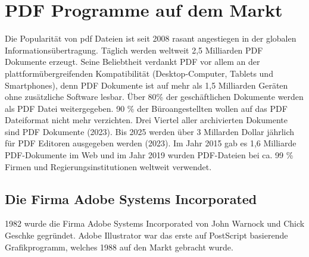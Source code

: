 \chapter{PDF Programme auf dem Markt}
Die Popularität von \gls{pdf} Dateien ist seit 2008 rasant angestiegen in der globalen Informationsübertragung. Täglich werden weltweit 2,5 Milliarden PDF Dokumente erzeugt. Seine Beliebtheit verdankt PDF vor allem an der plattformübergreifenden Kompatibilität (Desktop-Computer, Tablets und Smartphones), denn PDF Dokumente ist auf mehr als 1,5 Milliarden Geräten ohne zusätzliche Software lesbar. Über 80\% der geschäftlichen Dokumente werden als PDF Datei weitergegeben. \cite{formilo} 90 \% der Büroangestellten wollen auf das PDF Dateiformat nicht mehr verzichten. Drei Viertel aller archivierten Dokumente sind PDF Dokumente (2023). \cite{kofax}
Bis 2025 werden über 3 Millarden Dollar jährlich für PDF Editoren ausgegeben werden (2023). \cite{kofax} Im Jahr 2015 gab es 1,6 Milliarde PDF-Dokumente im Web und im Jahr 2019 wurden PDF-Dateien bei ca. 99 \% Firmen und Regierungsinstitutionen weltweit verwendet. \cite{ccc-break-pdf}

\section{Die Firma Adobe Systems Incorporated}
1982 wurde die Firma Adobe Systems Incorporated von John Warnock und Chick Geschke gegründet. Adobe Illustrator war das erste auf PostScript basierende Grafikprogramm, welches 1988 auf den Markt gebracht wurde. \cite{schneeberger}










